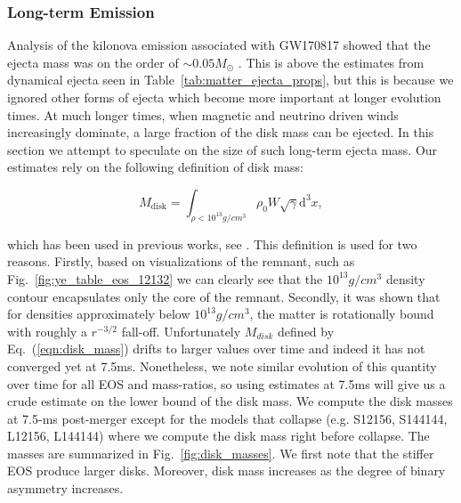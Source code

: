 \subsubsection{Long-term Emission}
\label{sec:long_term}
Analysis of the kilonova emission associated with GW170817 showed that the ejecta mass was on the order of $\sim 0.05M_\odot$ \cite{Metzger:2017wot,shibata2017gw170817}. This is above the estimates from dynamical ejecta seen in Table~\ref{tab:matter_ejecta_props}, but this is because we ignored other forms of ejecta which become more important at longer evolution times. At much longer times, when magnetic and neutrino driven winds increasingly dominate, a large fraction of the disk mass can be ejected. In this section we attempt to speculate on the size of such long-term ejecta mass. Our estimates rely on the following definition of disk mass:

\begin{equation}
  \label{eqn:disk_mass}
M_{\text{disk}} = \int_{\rho < 10^{13}g/cm^3} \rho_0 W \sqrt{\gamma} \mathrm{d}^3x,
\end{equation}

which has been used in previous works, see \cite{radice2018binary,shibata2017gw170817}. This definition is used for two reasons. Firstly, based on visualizations of the remnant, such as Fig.~\ref{fig:ye_table_eos_12132} we can clearly see that the $10^{13}g/cm^3$ density contour encapsulates only the core of the remnant. Secondly, it was shown that for densities approximately below $10^{13}g/cm^3$, the matter is rotationally bound with roughly a $r^{-3/2}$ fall-off\cite{hanauske2017rotational}. Unfortunately $M_{disk}$ defined by Eq.~(\ref{eqn:disk_mass}) drifts to larger values over time and indeed it has not converged yet at 7.5ms. Nonetheless, we note similar evolution of this quantity over time for all EOS and mass-ratios, so using estimates at 7.5ms will give us a crude estimate on the lower bound of the disk mass.  We compute the disk masses at 7.5-ms post-merger except for the models that collapse  (e.g. S12156, S144144, L12156, L144144) where we compute the disk mass right before collapse. The masses are summarized in Fig.~\ref{fig:disk_masses}. We first note that the stiffer EOS produce larger disks. Moreover, disk mass increases as the degree of binary asymmetry increases.


